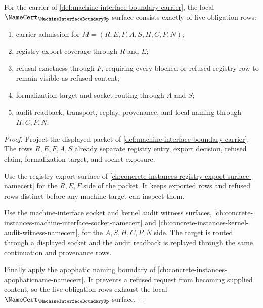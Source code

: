 \begin{theorem}
\label{thm:machine-interface-boundary-obligation-surface}
For the carrier of \autoref{def:machine-interface-boundary-carrier}, the local $\NameCert_{\MachineInterfaceBoundaryUp}$ surface consists exactly of five obligation rows:
\begin{enumerate}
\item carrier admission for $M=(R,E,F,A,S,H,C,P,N)$;
\item registry-export coverage through $R$ and $E$;
\item refusal exactness through $F$, requiring every blocked or refused registry row to remain visible as refused content;
\item formalization-target and socket routing through $A$ and $S$;
\item audit readback, transport, replay, provenance, and local naming through $H,C,P,N$.
\end{enumerate}
\end{theorem}
\begin{proof}
Project the displayed packet of \autoref{def:machine-interface-boundary-carrier}. The rows $R,E,F,A,S$ already separate registry entry, export decision, refused claim, formalization target, and socket exposure.

Use the registry-export surface of \autoref{ch:concrete-instances-registry-export-surface-namecert} for the $R,E,F$ side of the packet. It keeps exported rows and refused rows distinct before any machine target can inspect them.

Use the machine-interface socket and kernel audit witness surfaces, \autoref{ch:concrete-instances-machine-interface-socket-namecert} and \autoref{ch:concrete-instances-kernel-audit-witness-namecert}, for the $A,S,H,C,P,N$ side. The target is routed through a displayed socket and the audit readback is replayed through the same continuation and provenance rows.

Finally apply the apophatic naming boundary of \autoref{ch:concrete-instances-apophaticname-namecert}. It prevents a refused request from becoming supplied content, so the five obligation rows exhaust the local $\NameCert_{\MachineInterfaceBoundaryUp}$ surface.
\end{proof}

